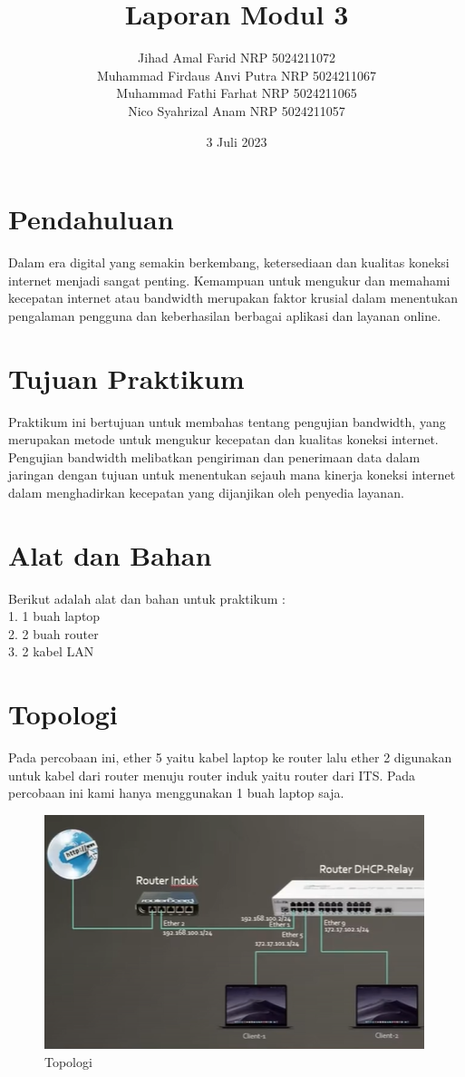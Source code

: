 \documentclass{article}
\title{Laporan Modul 3}
\author{Jihad Amal Farid NRP 5024211072 \\ Muhammad Firdaus Anvi Putra NRP 5024211067 \\ Muhammad Fathi Farhat NRP 5024211065 \\ Nico Syahrizal Anam NRP 5024211057}
\date{3 Juli 2023}
\begin{document}
    \maketitle
    \section{Pendahuluan}
    Dalam era digital yang semakin berkembang, ketersediaan dan kualitas koneksi internet menjadi sangat penting. Kemampuan untuk mengukur dan memahami kecepatan internet atau bandwidth merupakan faktor krusial dalam menentukan pengalaman pengguna dan keberhasilan berbagai aplikasi dan layanan online.
    
    \section{Tujuan Praktikum}
    Praktikum ini bertujuan untuk membahas tentang pengujian bandwidth, yang merupakan metode untuk mengukur kecepatan dan kualitas koneksi internet. Pengujian bandwidth melibatkan pengiriman dan penerimaan data dalam jaringan dengan tujuan untuk menentukan sejauh mana kinerja koneksi internet dalam menghadirkan kecepatan yang dijanjikan oleh penyedia layanan.
    
    \section{Alat dan Bahan}
    Berikut adalah alat dan bahan untuk praktikum : \\
    1. 1 buah laptop \\ 
    2. 2 buah router \\
    3. 2 kabel LAN \\
    
    \newpage
    \section{Topologi}
    Pada percobaan ini, ether 5 yaitu kabel laptop ke router lalu ether 2 digunakan untuk kabel dari router menuju router induk yaitu router dari ITS. Pada percobaan ini kami hanya menggunakan 1 buah laptop saja.
    \begin{figure}[h!]
        \includegraphics{Topologi.png}
        \caption{Topologi}
    \end{figure}
\end{document}
